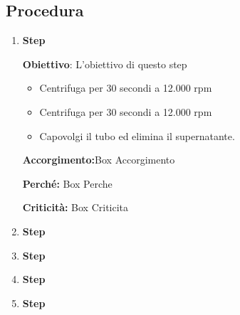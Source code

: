 \subsection{Procedura}
\begin{enumerate}
    \item \textbf{Step}
    
    {\footnotesize \textbf{Obiettivo}: L'obiettivo di questo step}

    \begin{itemize}
        \item Centrifuga per 30 secondi a 12.000 rpm
        \item Centrifuga per 30 secondi a 12.000 rpm
        \item Capovolgi il tubo ed elimina il supernatante.
    \end{itemize}

    \begin{accorgimentoBox}
    \textbf{Accorgimento:}Box Accorgimento
    \end{accorgimentoBox}

    \begin{percheBox}
    \textbf{Perché:} Box Perche
    \end{percheBox}

    \begin{criticitaBox}
    \textbf{Criticità:} Box Criticita
    \end{criticitaBox}

    \item \textbf{Step}
    \item \textbf{Step}
    \item \textbf{Step}
    \item \textbf{Step}
\end{enumerate}
